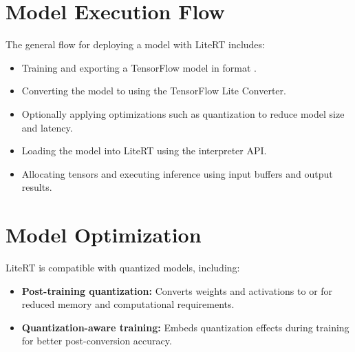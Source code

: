 

\section{Model Execution Flow}



The general flow for deploying a model with LiteRT includes:



\begin{itemize}

	\item Training and exporting a TensorFlow model in format .

	\item Converting the model to  using the TensorFlow Lite Converter.

	\item Optionally applying optimizations such as quantization to reduce model size and latency.

	\item Loading the model into LiteRT using the interpreter API.

	\item Allocating tensors and executing inference using input buffers and output results.

\end{itemize}



\section{Model Optimization}



LiteRT is compatible with quantized models, including:



\begin{itemize}

	\item \textbf{Post-training quantization:} Converts weights and activations to  or  for reduced memory and computational requirements.

	\item \textbf{Quantization-aware training:} Embeds quantization effects during training for better post-conversion accuracy.

\end{itemize}



